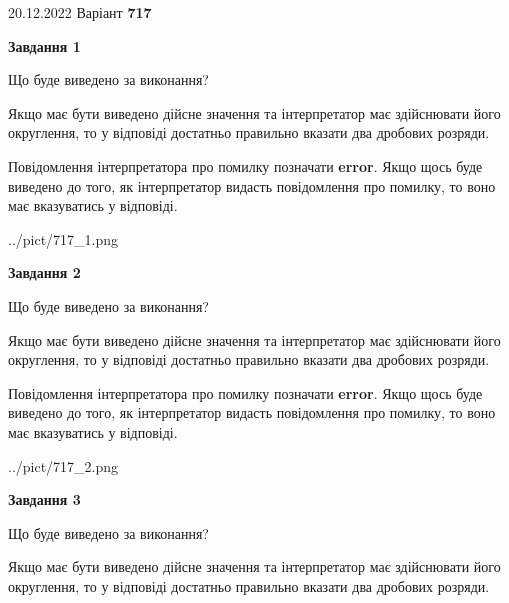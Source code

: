 \documentclass[12pt, ukrainian]{article}
\begin{document}
{20.12.2022 Варіант \No \textbf { 717 }\par}
{
\begin {Large}

{\begin {center}\textbf{Завдання 1}\end {center}}\par
Що буде виведено за виконання? \par

Якщо має бути виведено дійсне значення та інтерпретатор має здійснювати його округлення, 
то у відповіді достатньо правильно вказати два дробових розряди.

Повідомлення інтерпретатора про помилку позначати \textbf{error}.
Якщо щось буде виведено до того, як інтерпретатор видасть повідомлення про помилку, 
то воно має вказуватись у відповіді. \par

\begin{center}
	{../pict/717_1.png}
\end{center}
\newpage

{\begin {center}\textbf{Завдання 2}\end {center}}\par
Що буде виведено за виконання? \par

Якщо має бути виведено дійсне значення та інтерпретатор має здійснювати його округлення, 
то у відповіді достатньо правильно вказати два дробових розряди.

Повідомлення інтерпретатора про помилку позначати \textbf{error}.
Якщо щось буде виведено до того, як інтерпретатор видасть повідомлення про помилку, 
то воно має вказуватись у відповіді. \par

\begin{center}
	{../pict/717_2.png}
\end{center}
\newpage

{\begin {center}\textbf{Завдання 3}\end {center}}\par
Що буде виведено за виконання? \par

Якщо має бути виведено дійсне значення та інтерпретатор має здійснювати його округлення, 
то у відповіді достатньо правильно вказати два дробових розряди.


\end{Large}}
\end{document}
